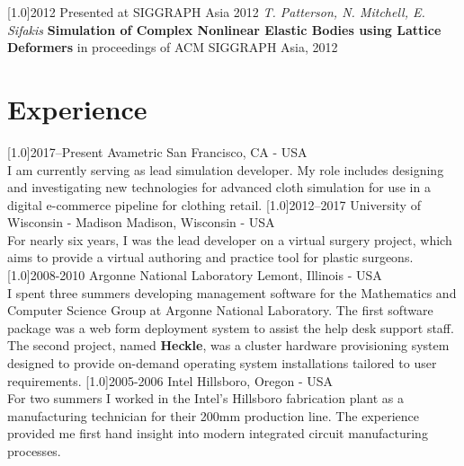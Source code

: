 \documentclass{cv-style}     %
\begin{document}
\begin{entrylist}
\entry
{\scalebox{.8}[1.0]{2012}}
{}
{Presented at SIGGRAPH Asia 2012}
{\textit{T. Patterson, N. Mitchell, E. Sifakis}  \textbf{Simulation
of Complex Nonlinear Elastic Bodies using Lattice
Deformers}  in proceedings of ACM SIGGRAPH Asia,
2012}
\end{entrylist}
  \vspace{-0.2cm}
\section{Experience}
  \vspace{-0.2cm}
\begin{entrylist}
\entry
  {\scalebox{.8}[1.0]{2017--Present}}
  {Avametric}
  {San Francisco, CA - USA }
  {\\
    I am currently serving as lead simulation
    developer. My role includes designing and
    investigating new technologies for advanced
    cloth simulation for use in a digital
    e-commerce pipeline for clothing retail.
}
\entry
  {\scalebox{.8}[1.0]{2012--2017}}
  {University of Wisconsin - Madison}
  {Madison, Wisconsin - USA}
  {\\    
    For nearly six years, I was the
    lead developer on a virtual surgery project,
    which aims to provide a virtual authoring and
    practice tool for plastic surgeons. 
}
 \entry
{\scalebox{.8}[1.0]{2008-2010}}
{Argonne National  Laboratory}
{Lemont, Illinois - USA}
{\\
  I spent three summers developing management
  software for the Mathematics and Computer
  Science Group at Argonne National
  Laboratory. The first software package was a web
  form deployment system to assist the help desk
  support staff. The second project, named
  \textbf{Heckle}, was a cluster hardware
  provisioning system designed to provide
  on-demand operating system installations
  tailored to user requirements.
  }
 \entry
{\scalebox{.8}[1.0]{2005-2006}}
 {Intel}
 {Hillsboro, Oregon - USA}
{\\
 For two summers I worked in the Intel's Hillsboro
 fabrication plant as a manufacturing technician
 for their 200mm production line. The experience
 provided me first hand insight into modern
 integrated circuit manufacturing processes. 
  }

\end{entrylist}
\end{document}
